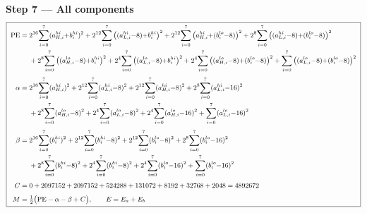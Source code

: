 \documentclass[fleqn]{article}
\begin{document}
\textbf{Step 7 --- All components}
{\setlength{\mathindent}{0em}
\[
\small
\boxed{\;
\begin{aligned}
\mathrm{PE} ={}& 2^{16}\!\sum_{i=0}^{7}(a_{H,i}^{hi}{+}b_i^{hi})^2 + 2^{12}\!\sum_{i=0}^{7}\big((a_{L,i}^{hi}{-}8){+}b_i^{hi}\big)^2 + 2^{12}\!\sum_{i=0}^{7}\big(a_{H,i}^{hi}{+}(b_i^{lo}{-}8)\big)^2 + 2^{8}\!\sum_{i=0}^{7}\big((a_{L,i}^{hi}{-}8){+}(b_i^{lo}{-}8)\big)^2 \\
  & + 2^{8}\!\sum_{i=0}^{7}\big((a_{H,i}^{lo}{-}8){+}b_i^{hi}\big)^2 + 2^{4}\!\sum_{i=0}^{7}\big((a_{L,i}^{lo}{-}8){+}b_i^{hi}\big)^2 + 2^{4}\!\sum_{i=0}^{7}\big((a_{H,i}^{lo}{-}8){+}(b_i^{lo}{-}8)\big)^2 + \sum_{i=0}^{7}\big((a_{L,i}^{lo}{-}8){+}(b_i^{lo}{-}8)\big)^2 \\[0.3em]
\alpha ={}& 2^{16}\!\sum_{i=0}^{7}(a_{H,i}^{hi})^2 + 2^{12}\!\sum_{i=0}^{7}(a_{L,i}^{hi}{-}8)^2 + 2^{12}\!\sum_{i=0}^{7}(a_{H,i}^{hi}{-}8)^2 + 2^{8}\!\sum_{i=0}^{7}(a_{L,i}^{hi}{-}16)^2 \\
  & + 2^{8}\!\sum_{i=0}^{7}(a_{H,i}^{lo}{-}8)^2 + 2^{4}\!\sum_{i=0}^{7}(a_{L,i}^{lo}{-}8)^2 + 2^{4}\!\sum_{i=0}^{7}(a_{H,i}^{lo}{-}16)^2 + \sum_{i=0}^{7}(a_{L,i}^{lo}{-}16)^2 \\[0.3em]
\beta ={}& 2^{16}\!\sum_{i=0}^{7}(b_i^{hi})^2 + 2^{12}\!\sum_{i=0}^{7}(b_i^{hi}{-}8)^2 + 2^{12}\!\sum_{i=0}^{7}(b_i^{lo}{-}8)^2 + 2^{8}\!\sum_{i=0}^{7}(b_i^{lo}{-}16)^2 \\
  & + 2^{8}\!\sum_{i=0}^{7}(b_i^{hi}{-}8)^2 + 2^{4}\!\sum_{i=0}^{7}(b_i^{hi}{-}8)^2 + 2^{4}\!\sum_{i=0}^{7}(b_i^{lo}{-}16)^2 + \sum_{i=0}^{7}(b_i^{lo}{-}16)^2 \\[0.3em]
C ={}& 0 + 2097152 + 2097152 + 524288 + 131072 + 8192 + 32768 + 2048 = 4892672 \\[0.3em]
M ={}& \tfrac12\big(\mathrm{PE} - \alpha - \beta + C\big), \qquad E = E_a + E_b
\end{aligned}
\;}
\]
}
\end{document}
